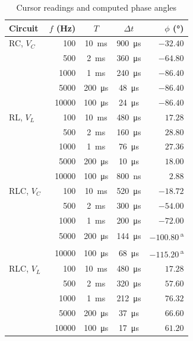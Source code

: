 \documentclass[11pt]{article}
\begin{document}
\begin{table}[H]
    \centering
    \caption{Cursor readings and computed phase angles}
    \small
    \begin{tabular}{lrccr}
        \toprule
        Circuit & $f$ (Hz) & $T$ & $\Delta t$ & $\phi$ (\si{\degree}) \\
        \midrule
        RC, $V_C$   & 100   & \SI{10}{\milli\second}  & \SI{900}{\micro\second} & $-32.40$ \\
                    & 500   & \SI{2}{\milli\second}   & \SI{360}{\micro\second} & $-64.80$ \\
                    & 1000  & \SI{1}{\milli\second}   & \SI{240}{\micro\second} & $-86.40$ \\
                    & 5000  & \SI{200}{\micro\second} & \SI{48}{\micro\second}  & $-86.40$ \\
                    & 10000 & \SI{100}{\micro\second} & \SI{24}{\micro\second}  & $-86.40$ \\
        \midrule
        RL, $V_L$   & 100   & \SI{10}{\milli\second}  & \SI{480}{\micro\second} & $17.28$ \\
                    & 500   & \SI{2}{\milli\second}   & \SI{160}{\micro\second} & $28.80$ \\
                    & 1000  & \SI{1}{\milli\second}   & \SI{76}{\micro\second}  & $27.36$ \\
                    & 5000  & \SI{200}{\micro\second} & \SI{10}{\micro\second}  & $18.00$ \\
                    & 10000 & \SI{100}{\micro\second} & \SI{800}{\nano\second}  & $2.88$ \\
        \midrule
        RLC, $V_C$  & 100   & \SI{10}{\milli\second}  & \SI{520}{\micro\second} & $-18.72$ \\
                    & 500   & \SI{2}{\milli\second}   & \SI{300}{\micro\second} & $-54.00$ \\
                    & 1000  & \SI{1}{\milli\second}   & \SI{200}{\micro\second} & $-72.00$ \\
                    & 5000  & \SI{200}{\micro\second} & \SI{144}{\micro\second} & $-100.80$\,\textsuperscript{a} \\
                    & 10000 & \SI{100}{\micro\second} & \SI{68}{\micro\second}  & $-115.20$\,\textsuperscript{a} \\
        \midrule
        RLC, $V_L$  & 100   & \SI{10}{\milli\second}  & \SI{480}{\micro\second} & $17.28$ \\
                    & 500   & \SI{2}{\milli\second}   & \SI{320}{\micro\second} & $57.60$ \\
                    & 1000  & \SI{1}{\milli\second}   & \SI{212}{\micro\second} & $76.32$ \\
                    & 5000  & \SI{200}{\micro\second} & \SI{37}{\micro\second}  & $66.60$ \\
                    & 10000 & \SI{100}{\micro\second} & \SI{17}{\micro\second}  & $61.20$ \\
        \bottomrule
    \end{tabular}


\end{table}
\end{document}
